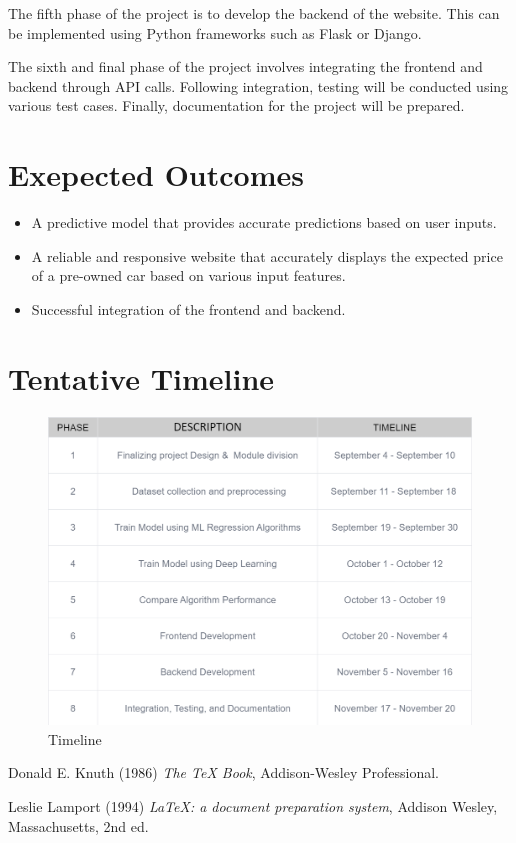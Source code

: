 \documentclass[a4paper,12pt]{article}
\begin{document}
\begin{justify}
The fifth phase of the project is to develop the backend of the website. This can be implemented using Python frameworks such as Flask or Django.
\newline

The sixth and final phase of the project involves integrating the frontend and backend through API calls. Following integration, testing will be conducted using various test cases. Finally, documentation for the project will be prepared.

\newpage
\section*{Exepected Outcomes}
	\begin{itemize}
		\item A predictive model that provides accurate predictions based on user inputs.
		\item A reliable and responsive website that accurately displays the expected price of a pre-owned car based on various input features.
		\item Successful integration of the frontend and backend.

	 \end{itemize}

\section*{Tentative Timeline}
\begin{figure}[h]
    \centering
    \includegraphics[width=.8\textwidth]{./timeline.png}
    \caption{Timeline}
    \label{fig:your-s}
\end{figure}


\begin{thebibliography}{9}
Donald E. Knuth (1986) \emph{The \TeX{} Book}, Addison-Wesley Professional.

Leslie Lamport (1994) \emph{\LaTeX: a document preparation system}, Addison
Wesley, Massachusetts, 2nd ed.
\end{thebibliography}

\end{justify}
\end{document}
